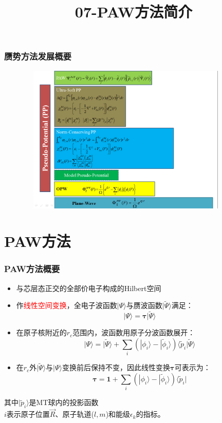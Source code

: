 {\frame
{
	\frametitle{赝势方法发展概要}
\begin{figure}[h!]
\centering
\vspace*{-0.25in}
\includegraphics[height=2.80in,width=4.10in,viewport=0 0 1190 875,clip]{Figures/Pseudo_Potential.png}
\label{Pseudo_Poential}
\end{figure}
}

\title{07-\rm{PAW}方法简介}
\section{\rm{PAW}方法}
\frame
{
	\frametitle{\textrm{PAW}方法概要}
\begin{itemize}
	\item 与芯层态正交的全部价电子构成的\textrm{Hilbert}空间%
	\item 作\textcolor{red}{线性空间变换}，全电子波函数$|\Psi\rangle$与赝波函数$|\tilde\Psi\rangle$满足：
		$$|\Psi\rangle=\mathbf{\tau|}\tilde\Psi\rangle$$
	\item 在原子核附近的$r_c$范围内，波函数用原子分波函数展开：
	$$|\Psi\rangle=|\tilde\Psi\rangle+\sum_i(|\phi_i\rangle-|\tilde\phi_i\rangle)\langle\tilde p_i|\tilde\Psi\rangle$$
	\item 在$r_c$外$|\tilde\Psi\rangle$与$|\Psi\rangle$变换前后保持不变，因此线性变换$\mathbf{\tau}$可表示为：
	$$\mathbf{\tau}=\mathbf{1}+\sum_i(|\phi_i\rangle-|\tilde\phi_i\rangle)\langle\tilde p_i|$$
\end{itemize}
其中$|\tilde p_i\rangle$是\textrm{MT}球内的投影函数\\
$i$表示原子位置$\vec R$、原子轨道($l,m$)和能级$\epsilon_k$的指标。
}

}
